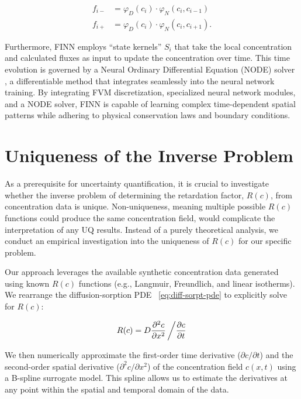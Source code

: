 \begin{align*}
    f_{i-} &= \varphi_D(c_i) \cdot \varphi_N(c_i, c_{i-1}) \\
    f_{i+} &= \varphi_D(c_i) \cdot \varphi_N(c_i, c_{i+1}).
\end{align*}

Furthermore, FINN employs ``state kernels'' $S_i$ that take the local concentration and calculated fluxes as input to update the concentration over time. This time evolution is governed by a Neural Ordinary Differential Equation (NODE) solver \cite{chen2019neuralordinarydifferentialequations}, a differentiable method that integrates seamlessly into the neural network training. By integrating FVM discretization, specialized neural network modules, and a NODE solver, FINN is capable of learning complex time-dependent spatial patterns while adhering to physical conservation laws and boundary conditions.



\section{Uniqueness of the Inverse Problem}
\label{sec:uniqueness}

As a prerequisite for uncertainty quantification, it is crucial to investigate whether the inverse problem of determining the retardation factor, $R(c)$, from concentration data is unique. Non-uniqueness, meaning multiple possible $R(c)$ functions could produce the same concentration field, would complicate the interpretation of any UQ results. Instead of a purely theoretical analysis, we conduct an empirical investigation into the uniqueness of $R(c)$ for our specific problem.

Our approach leverages the available synthetic concentration data generated using known $R(c)$ functions (e.g., Langmuir, Freundlich, and linear isotherms). We rearrange the diffusion-sorption PDE ~\vref{eq:diff-sorpt-pde} to explicitly solve for $R(c)$:

\begin{equation}
    R(c) = D \frac{\partial^2 c}{\partial x^2} \left/ \frac{\partial c}{\partial t} \right .
    \label{eq:rearranged_pde}
\end{equation}

We then numerically approximate the first-order time derivative ($\partial c / \partial t$) and the second-order spatial derivative ($\partial^2 c / \partial x^2$) of the concentration field $c(x,t)$ using a B-spline surrogate model. This spline allows us to estimate the derivatives at any point within the spatial and temporal domain of the data.

